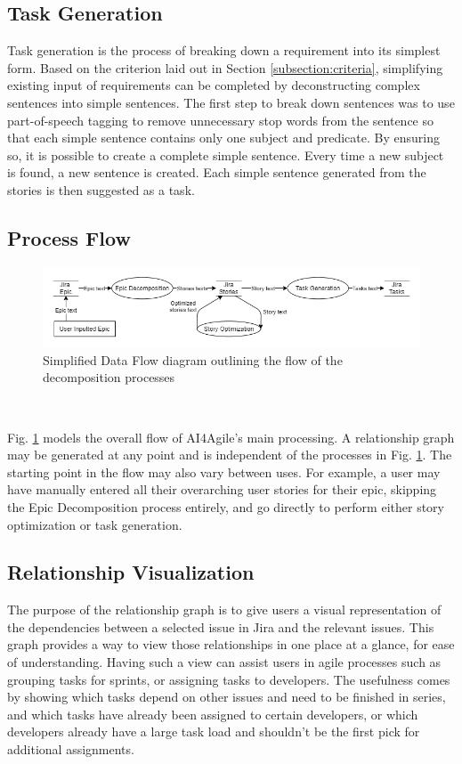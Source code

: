\subsection{Task Generation}

Task generation is the process of breaking down a requirement into its simplest form. Based on the criterion laid out in Section \ref{subsection:criteria}, simplifying existing input of requirements can be completed by deconstructing complex sentences into simple sentences. 
The first step to break down sentences was to use part-of-speech tagging to remove unnecessary stop words from the sentence so that each simple sentence contains only one subject and predicate. By ensuring so, it is possible to create a complete simple sentence. Every time a new subject is found, a new sentence is created. Each simple sentence generated from the stories is then suggested as a task.

\subsection{Process Flow}

\begin{figure}
\centering
\includegraphics[width=\textwidth,keepaspectratio]{./figure/ExampleDataFlowDiagram.png}
\caption{Simplified Data Flow diagram outlining the flow of the decomposition processes}
\label{fig:ExampleDataFlowDiagram}
\end{figure}\

Fig. \ref{fig:ExampleDataFlowDiagram} models the overall flow of AI4Agile’s main processing. A relationship graph may be generated at any point and is independent of the processes in Fig. \ref{fig:ExampleDataFlowDiagram}.  The starting point in the flow may also vary between uses. For example, a user may have manually entered all their overarching user stories for their epic, skipping the Epic Decomposition process entirely, and go directly to perform either story optimization or task generation.

\subsection{Relationship Visualization}
The purpose of the relationship graph is to give users a visual representation of the dependencies between a selected issue in Jira and the relevant issues. This graph provides a way to view those relationships in one place at a glance, for ease of understanding. Having such a view can assist users in agile processes such as grouping tasks for sprints, or assigning tasks to developers. The usefulness comes by showing which tasks depend on other issues and need to be finished in series, and which tasks have already been assigned to certain developers, or which developers already have a large task load and shouldn't be the first pick for additional assignments. 

